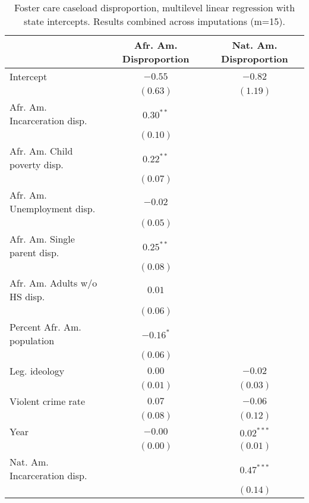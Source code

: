 
\begin{table}
\caption{Foster care caseload disproportion, multilevel linear
regression with state intercepts. Results combined across imputations (m=15).}
\begin{center}
\begin{tabular}{l c c }
\hline
 & Afr. Am. Disproportion & Nat. Am. Disproportion \\
\hline
Intercept                    & $-0.55$     & $-0.82$       \\
                             & $(0.63)$    & $(1.19)$      \\
Afr. Am. Incarceration disp. & $0.30^{**}$ &               \\
                             & $(0.10)$    &               \\
Afr. Am. Child poverty disp. & $0.22^{**}$ &               \\
                             & $(0.07)$    &               \\
Afr. Am. Unemployment disp.  & $-0.02$     &               \\
                             & $(0.05)$    &               \\
Afr. Am. Single parent disp. & $0.25^{**}$ &               \\
                             & $(0.08)$    &               \\
Afr. Am. Adults w/o HS disp. & $0.01$      &               \\
                             & $(0.06)$    &               \\
Percent Afr. Am. population  & $-0.16^{*}$ &               \\
                             & $(0.06)$    &               \\
Leg. ideology                & $0.00$      & $-0.02$       \\
                             & $(0.01)$    & $(0.03)$      \\
Violent crime rate           & $0.07$      & $-0.06$       \\
                             & $(0.08)$    & $(0.12)$      \\
Year                         & $-0.00$     & $0.02^{***}$  \\
                             & $(0.00)$    & $(0.01)$      \\
Nat. Am. Incarceration disp. &             & $0.47^{***}$  \\
                             &             & $(0.14)$      \\

\end{tabular}
\end{center}
\end{table}
